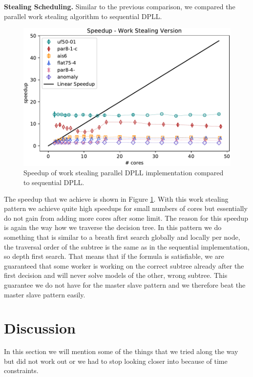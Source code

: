 \documentclass[letterpaper]{article}
\newcommand{\mypar}[1]{{\bf #1.}}
\begin{document}
\mypar{Stealing Scheduling}
Similar to the previous comparison, we compared the parallel work stealing algorithm to sequential DPLL.
\begin{figure}
  \centering
  \includegraphics[width=\columnwidth]{figures/scaling_stealing_subset_dpll_scaling_tar.pdf}
  \caption{Speedup of work stealing parallel DPLL implementation compared to sequential DPLL.
  \label{fig:dpll_stealing_speedup}}
\end{figure}

The speedup that we achieve is shown in Figure \ref{fig:dpll_stealing_speedup}.
With this work stealing pattern we achieve quite high speedups for small numbers of cores but essentially do not gain from adding more cores after some limit.
The reason for this speedup is again the way how we traverse the decision tree.
In this pattern we do something that is similar to a breath first search globally and locally per node, the traversal order of the subtree is the same as in the sequential implementation, so depth first search.
That means that if the formula is satisfiable, we are guaranteed that some worker is working on the correct subtree already after the first decision and will never solve models of the other, wrong subtree.
This guarantee we do not have for the master slave pattern and we therefore beat the master slave pattern easily.

\section{Discussion}
In this section we will mention some of the things that we tried along the way but did not work out or we had to stop looking closer into because of time constraints.
\end{document}
